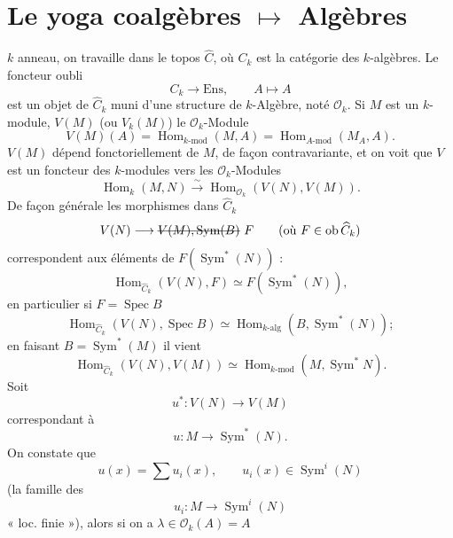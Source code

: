 \documentclass[11pt,a4paper]{article}
\begin{document}
\section{Le yoga coalgèbres $\mapsto$ Algèbres}


$k$ anneau, on travaille dans le topos $\widehat{C}$, où $C_k$ est la catégorie des $k$-algèbres. Le foncteur oubli
\[
  C_k \longrightarrow \mathrm{Ens}, \qquad A \longmapsto A
\]
est un objet de $\widehat{C}_k$ muni d'une structure de $k$-Algèbre,  noté $\mathcal{O}_k$. Si $M$ est un $k$-module, $V(M)$ (ou $V_k(M)$)  le  $\mathcal{O}_k$-Module
\[
  V(M)(A) = \operatorname{Hom}_{k\text{-mod}}(M, A) = \operatorname{Hom}_{A\text{-mod}}(M_A, A).
\]
$V(M)$ dépend fonctoriellement de $M$, de façon contravariante, et on voit que $V$ est un foncteur  des $k$-modules vers les $\mathcal{O}_k$-Modules
\[
  \operatorname{Hom}_k(M, N) \xrightarrow{\ \sim\ } \operatorname{Hom}_{\mathcal{O}_k}(V(N), V(M)).
\]
De façon générale les morphismes dans $\widehat{C}_k$
\[
  V(N) \longrightarrow \text{\struck{$V(M), \operatorname{Sym}(B)$}}\ F \qquad (\text{où } F \in \operatorname{ob} \widehat{C}_k)
\]
correspondent aux éléments de $F(\operatorname{Sym}^*(N))$ :
\[
  \operatorname{Hom}_{\widehat{C}_k}(V(N), F) \simeq F(\operatorname{Sym}^*(N)),
\]
en particulier si $F = \operatorname{Spec} B$
\[
  \operatorname{Hom}_{\widehat{C}_k}(V(N), \operatorname{Spec} B) \simeq \operatorname{Hom}_{k\text{-alg}}(B, \operatorname{Sym}^*(N)) ;
\]
en faisant $B = \operatorname{Sym}^*(M)$ il vient
\[
  \operatorname{Hom}_{\widehat{C}_k}(V(N), V(M)) \simeq \operatorname{Hom}_{k\text{-mod}}(M, \operatorname{Sym}^* N).
\]
Soit
\[
  u^* : V(N) \longrightarrow V(M)
\]
correspondant à
\[
  u : M \longrightarrow \operatorname{Sym}^*(N).
\]
On constate que \struck{\ill{}}
\[
  u(x) = \sum u_i(x), \qquad u_i(x) \in \operatorname{Sym}^i(N)
\]
(la famille des \struck{\ill{}}
\[
  u_i : M \longrightarrow \operatorname{Sym}^i(N)
\]
\struck{\ill{}} « loc. finie »), alors si on a $\lambda \in \mathcal{O}_k(A) = A$
\end{document}
